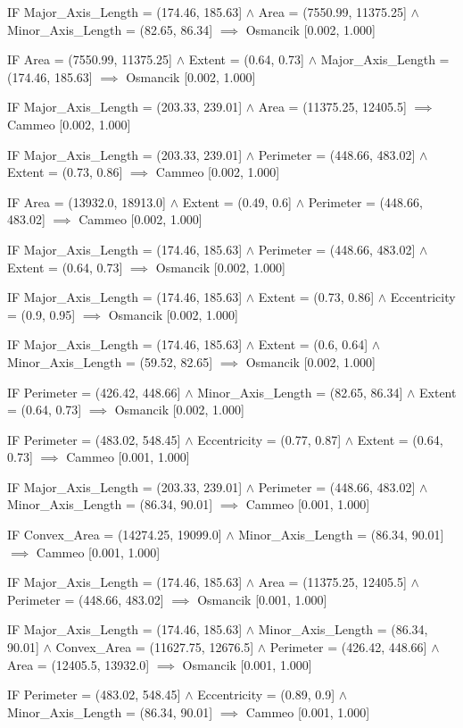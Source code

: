 IF Major_Axis_Length = (174.46, 185.63] $\land$ Area = (7550.99, 11375.25] $\land$ Minor_Axis_Length = (82.65, 86.34] $\implies$ Osmancik [0.002, 1.000]

IF Area = (7550.99, 11375.25] $\land$ Extent = (0.64, 0.73] $\land$ Major_Axis_Length = (174.46, 185.63] $\implies$ Osmancik [0.002, 1.000]

IF Major_Axis_Length = (203.33, 239.01] $\land$ Area = (11375.25, 12405.5] $\implies$ Cammeo [0.002, 1.000]

IF Major_Axis_Length = (203.33, 239.01] $\land$ Perimeter = (448.66, 483.02] $\land$ Extent = (0.73, 0.86] $\implies$ Cammeo [0.002, 1.000]

IF Area = (13932.0, 18913.0] $\land$ Extent = (0.49, 0.6] $\land$ Perimeter = (448.66, 483.02] $\implies$ Cammeo [0.002, 1.000]

IF Major_Axis_Length = (174.46, 185.63] $\land$ Perimeter = (448.66, 483.02] $\land$ Extent = (0.64, 0.73] $\implies$ Osmancik [0.002, 1.000]

IF Major_Axis_Length = (174.46, 185.63] $\land$ Extent = (0.73, 0.86] $\land$ Eccentricity = (0.9, 0.95] $\implies$ Osmancik [0.002, 1.000]

IF Major_Axis_Length = (174.46, 185.63] $\land$ Extent = (0.6, 0.64] $\land$ Minor_Axis_Length = (59.52, 82.65] $\implies$ Osmancik [0.002, 1.000]

IF Perimeter = (426.42, 448.66] $\land$ Minor_Axis_Length = (82.65, 86.34] $\land$ Extent = (0.64, 0.73] $\implies$ Osmancik [0.002, 1.000]

IF Perimeter = (483.02, 548.45] $\land$ Eccentricity = (0.77, 0.87] $\land$ Extent = (0.64, 0.73] $\implies$ Cammeo [0.001, 1.000]

IF Major_Axis_Length = (203.33, 239.01] $\land$ Perimeter = (448.66, 483.02] $\land$ Minor_Axis_Length = (86.34, 90.01] $\implies$ Cammeo [0.001, 1.000]

IF Convex_Area = (14274.25, 19099.0] $\land$ Minor_Axis_Length = (86.34, 90.01] $\implies$ Cammeo [0.001, 1.000]

IF Major_Axis_Length = (174.46, 185.63] $\land$ Area = (11375.25, 12405.5] $\land$ Perimeter = (448.66, 483.02] $\implies$ Osmancik [0.001, 1.000]

IF Major_Axis_Length = (174.46, 185.63] $\land$ Minor_Axis_Length = (86.34, 90.01] $\land$ Convex_Area = (11627.75, 12676.5] $\land$ Perimeter = (426.42, 448.66] $\land$ Area = (12405.5, 13932.0] $\implies$ Osmancik [0.001, 1.000]

IF Perimeter = (483.02, 548.45] $\land$ Eccentricity = (0.89, 0.9] $\land$ Minor_Axis_Length = (86.34, 90.01] $\implies$ Cammeo [0.001, 1.000]

